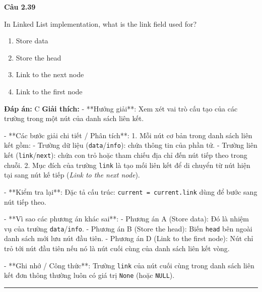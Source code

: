 \documentclass[11pt,a4paper]{article}
\newenvironment{question}[1]{%
  \par\vspace{1em}\noindent\textbf{\large Câu #1}\par\vspace{0.4em}
}{%
  \par\vspace{1em}\hrule\vspace{0.6em}
}
\newenvironment{choices}{%
  \begin{enumerate}[label=\textbf{\Alph*.},leftmargin=2.2em,itemsep=2pt,topsep=3pt]
}{%
  \end{enumerate}
}
\newcommand{\choice}{\item}
\begin{document}
\begin{question}{2.39}
In Linked List implementation, what is the link field used for?
\begin{choices}
\choice Store data
\choice Store the head
\choice Link to the next node
\choice Link to the first node
\end{choices}
\textbf{Đáp án:} C
\textbf{Giải thích:} - **Hướng giải**:
Xem xét vai trò cấu tạo của các trường trong một nút của danh sách liên kết.


- **Các bước giải chi tiết / Phân tích**:
1. Mỗi nút cơ bản trong danh sách liên kết gồm:
   - Trường dữ liệu (\texttt{data}/\texttt{info}): chứa thông tin của phần tử.
   - Trường liên kết (\texttt{link}/\texttt{next}): chứa con trỏ hoặc tham chiếu địa chỉ đến nút tiếp theo trong chuỗi.
2. Mục đích của trường \texttt{link} là tạo mối liên kết để di chuyển từ nút hiện tại sang nút kế tiếp (\textit{Link to the next node}).


- **Kiểm tra lại**:
Đặc tả cấu trúc: \texttt{current = current.link} dùng để bước sang nút tiếp theo.


- **Vì sao các phương án khác sai**:
- Phương án A (Store data): Đó là nhiệm vụ của trường \texttt{data}/\texttt{info}.
- Phương án B (Store the head): Biến \texttt{head} bên ngoài danh sách mới lưu nút đầu tiên.
- Phương án D (Link to the first node): Nút chỉ trỏ tới nút đầu tiên nếu nó là nút cuối cùng của danh sách liên kết vòng.


- **Ghi nhớ / Công thức**:
Trường \texttt{link} của nút cuối cùng trong danh sách liên kết đơn thông thường luôn có giá trị \texttt{None} (hoặc \texttt{NULL}).
\end{question}
\end{document}
